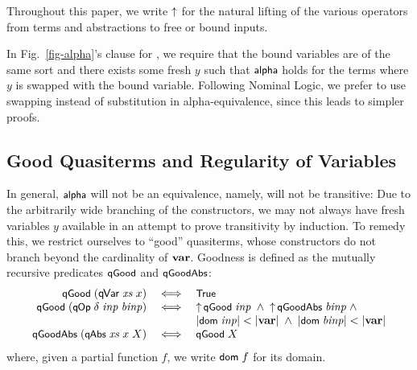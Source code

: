 \documentclass{llncs}
\begin{document}
\begin{conv}\rm
Throughout this paper, we write $\mbox{$\uparrow$}$ for the 
natural 
lifting of the various operators from terms and abstractions to free or bound inputs. 
\end{conv}

In Fig.~\ref{fig-alpha}'s clause for \abstractions{}, we require that the bound variables 
are of the same sort and %
there exists some fresh $y$ such that $\mbox{\rm\textsf{\small alpha}}$ holds 
for the terms where $y$ is swapped with the bound variable. Following %
Nominal Logic, 
we prefer to use swapping instead of substitution in alpha-equivalence, %
since this 
leads to simpler proofs. 




\subsection{Good Quasiterms and Regularity of Variables}
\label{subsec-good}

In general, %
$\mbox{\rm\textsf{\small alpha}}$ will not be an equivalence, namely, %
will not be transitive: Due to the arbitrarily wide branching of the constructors, 
we may not always have fresh variables $y$ 
available in an attempt to prove transitivity by induction. 
%
To remedy this, we restrict ourselves to ``good'' quasiterms, whose constructors do not branch  
beyond the cardinality of $\mbox{\bf var}$. Goodness is defined as the 
mutually recursive predicates 
$\mbox{\rm\textsf{\small qGood}}$ and $\mbox{\rm\textsf{\small qGoodAbs}}$: %
%
$$
\begin{array}{rcl}
\mbox{\rm\textsf{\small qGood}}\;(\mbox{\rm\textsf{q\hspace*{-0.2ex}Var}}\;\mbox{\textit{xs}}\;x) &\Longleftrightarrow&
   \mbox{\rm\textsf{\small True}}
\\
\mbox{\rm\textsf{\small qGood}}\;(\mbox{\rm\textsf{\small q\hspace*{-0.1ex}Op}}\;\delta\;\mbox{\textit{inp}}\;\mbox{\textit{binp}})  &\;\Longleftrightarrow\;&
   \mbox{$\uparrow$}\,\mbox{\rm\textsf{\small qGood}}\;\mbox{\textit{inp}} \;\wedge\; \mbox{$\uparrow$}\,\mbox{\rm\textsf{\small qGoodAbs}}\;\mbox{\textit{binp}} \;\wedge\;
\\ &&
|\mbox{\rm\textsf{\small dom}}\;\mbox{\textit{inp}}| < |\mbox{\bf var}| \;\wedge\; |\mbox{\rm\textsf{\small dom}}\;\mbox{\textit{binp}}| < |\mbox{\bf var}|
\\
\mbox{\rm\textsf{\small qGoodAbs}}\;(\mbox{\rm\textsf{\small q\hspace*{-0.1ex}Abs}}\;\mbox{\textit{xs}}\;x\;X) &\Longleftrightarrow&
    \mbox{\rm\textsf{\small qGood}}\;X
\end{array}
$$
%
where, given a partial function $f$, we write $\mbox{\rm\textsf{\small dom}}\;f$ for its domain. 
%


\end{document}
